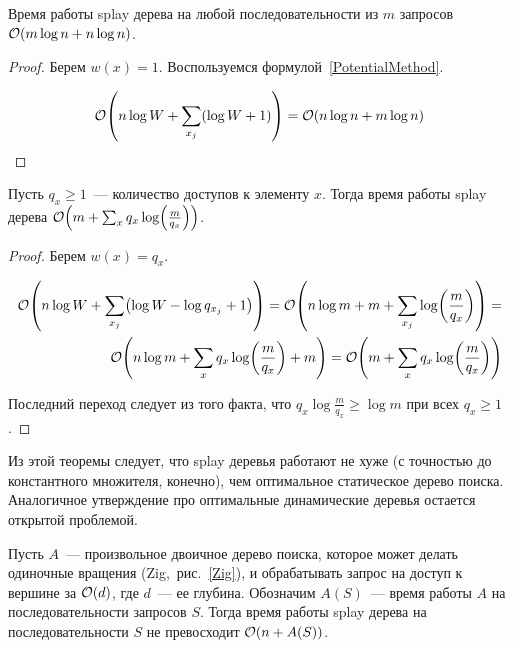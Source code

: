 \begin{corollary}
	Время работы splay дерева на любой последовательности из $m$ запросов $\BigO \parens*{m \log n + n \log n}$.
\end{corollary}
\begin{proof}
	Берем $w(x) = 1$. Воспользуемся формулой~\ref{PotentialMethod}.

	\begin{equation*}
		\BigO \parens*{n \log W + \sum_{x_j} (\log W + 1)} = \BigO \parens*{n \log n + m \log n}
	\end{equation*}
\end{proof}

\begin{corollary}
	Пусть $q_x \geq 1$~--- количество доступов к элементу $x$. Тогда время работы splay дерева $\BigO \parens*{m + \sum_x q_x \log \parens*{\frac{m}{q_x}}}$.
\end{corollary}
\begin{proof}
	Берем $w(x) = q_x$.

	\begin{align*}
		\BigO \parens*{n \log W + \sum_{x_j} \parens*{\log W - \log q_{x_j} + 1}} = \BigO \parens*{n \log m + m + \sum_{x_j} \log \parens*{\frac{m}{q_x}}} = \\
		\BigO \parens*{n \log m + \sum_{x} q_x \log \parens*{\frac{m}{q_x}} + m} = \BigO \parens*{m + \sum_x q_x \log \parens*{\frac{m}{q_x}}}
	\end{align*}

	Последний переход следует из того факта, что $q_x \log \frac{m}{q_x} \geq \log m$ при всех $q_x \geq 1$.
\end{proof}

Из этой теоремы следует, что splay деревья работают не хуже (с точностью до константного множителя, конечно), чем оптимальное статическое дерево поиска. Аналогичное утверждение про оптимальные динамические деревья остается открытой проблемой.

\begin{conjecture}
	Пусть $A$~--- произвольное двоичное дерево поиска, которое может делать одиночные вращения (Zig,~рис.~\ref{Zig}), и обрабатывать запрос на доступ к вершине за $\mathcal{O}(d)$, где $d$~--- ее глубина. Обозначим $A(S)$~--- время работы $A$ на последовательности запросов $S$. Тогда время работы splay дерева на последовательности $S$ не превосходит $\BigO \parens*{n + A(S)}$.
\end{conjecture}

